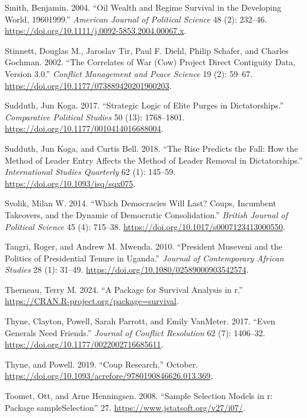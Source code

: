 \documentclass[
  12pt,
]{report}
\newlength{\cslhangindent}
\newenvironment{CSLReferences}[2] %
 {\begin{list}{}{%
  \setlength{\itemindent}{0pt}
  \setlength{\leftmargin}{0pt}
  \setlength{\parsep}{0pt}
  \ifodd #1
   \setlength{\leftmargin}{\cslhangindent}
   \setlength{\itemindent}{-1\cslhangindent}
  \fi
  \setlength{\itemsep}{#2\baselineskip}}}
 {\end{list}}
\begin{document}
\begin{CSLReferences}{1}{0}
Smith, Benjamin. 2004. {``Oil Wealth and Regime Survival in the
Developing World, 1960{\textendash}1999.''} \emph{American Journal of
Political Science} 48 (2): 232--46.
\url{https://doi.org/10.1111/j.0092-5853.2004.00067.x}.

Stinnett, Douglas M., Jaroslav Tir, Paul F. Diehl, Philip Schafer, and
Charles Gochman. 2002. {``The Correlates of War (Cow) Project Direct
Contiguity Data, Version 3.0.''} \emph{Conflict Management and Peace
Science} 19 (2): 59--67.
\url{https://doi.org/10.1177/073889420201900203}.

Sudduth, Jun Koga. 2017. {``Strategic Logic of Elite Purges in
Dictatorships.''} \emph{Comparative Political Studies} 50 (13):
1768--1801. \url{https://doi.org/10.1177/0010414016688004}.

Sudduth, Jun Koga, and Curtis Bell. 2018. {``The Rise Predicts the Fall:
How the Method of Leader Entry Affects the Method of Leader Removal in
Dictatorships.''} \emph{International Studies Quarterly} 62 (1):
145--59. \url{https://doi.org/10.1093/isq/sqx075}.

Svolik, Milan W. 2014. {``Which Democracies Will Last? Coups, Incumbent
Takeovers, and the Dynamic of Democratic Consolidation.''} \emph{British
Journal of Political Science} 45 (4): 715--38.
\url{https://doi.org/10.1017/s0007123413000550}.

Tangri, Roger, and Andrew M. Mwenda. 2010. {``President Museveni and the
Politics of Presidential Tenure in Uganda.''} \emph{Journal of
Contemporary African Studies} 28 (1): 31--49.
\url{https://doi.org/10.1080/02589000903542574}.

Therneau, Terry M. 2024. {``A Package for Survival Analysis in r.''}
\url{https://CRAN.R-project.org/package=survival}.

Thyne, Clayton, Powell, Sarah Parrott, and Emily VanMeter. 2017. {``Even
Generals Need Friends.''} \emph{Journal of Conflict Resolution} 62 (7):
1406--32. \url{https://doi.org/10.1177/0022002716685611}.

Thyne, and Powell. 2019. {``Coup Research,''} October.
\url{https://doi.org/10.1093/acrefore/9780190846626.013.369}.

Toomet, Ott, and Arne Henningsen. 2008. {``Sample Selection Models in
{\textbraceleft}r{\textbraceright}: Package
{\textbraceleft}sampleSelection{\textbraceright}''} 27.
\url{https://www.jstatsoft.org/v27/i07/}.


\end{CSLReferences}
\end{document}
